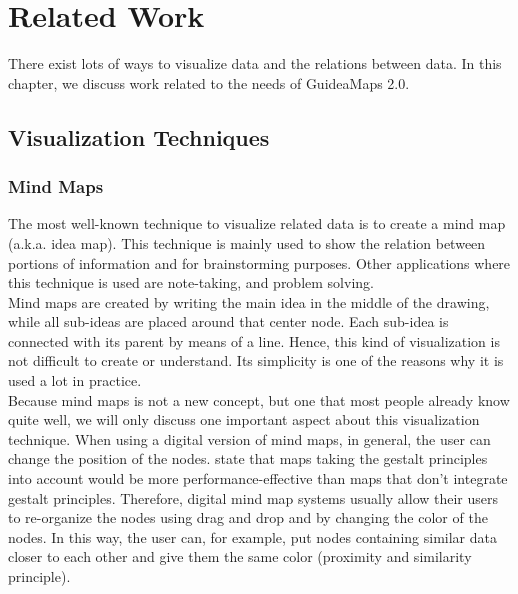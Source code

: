 \chapter{Related Work}\label{ch:related-work}

There exist lots of ways to visualize data and the relations between data. In this chapter, we discuss work related to the needs of GuideaMaps 2.0.


\section{Visualization Techniques}\label{sec:visualization-techniques}

\subsection{Mind Maps}\label{sec:mind-maps}
The most well-known technique to visualize related data is to create a mind map (a.k.a. idea map). This technique is mainly used to show the relation between portions of information and for brainstorming purposes. Other applications where this technique is used are note-taking, and problem solving. \citep{knowledgemapsbalaid} \\

Mind maps are created by writing the main idea in the middle of the drawing, while all sub-ideas are placed around that center node. Each sub-idea is connected with its parent by means of a line. Hence, this kind of visualization is not difficult to create or understand. Its simplicity is one of the reasons why it is used a lot in practice.\\

Because mind maps is not a new concept, but one that most people already know quite well, we will only discuss one important aspect about this visualization technique. When using a digital version of mind maps, in general, the user can change the position of the nodes. \cite{wiegmann-1992} state that maps taking the gestalt principles into account would be more performance-effective than maps that don't integrate gestalt principles. Therefore, digital mind map systems usually allow their users to re-organize the nodes using drag and drop and by changing the color of the nodes. In this way, the user can, for example, put nodes containing similar data closer to each other and give them the same color (proximity and similarity principle).



